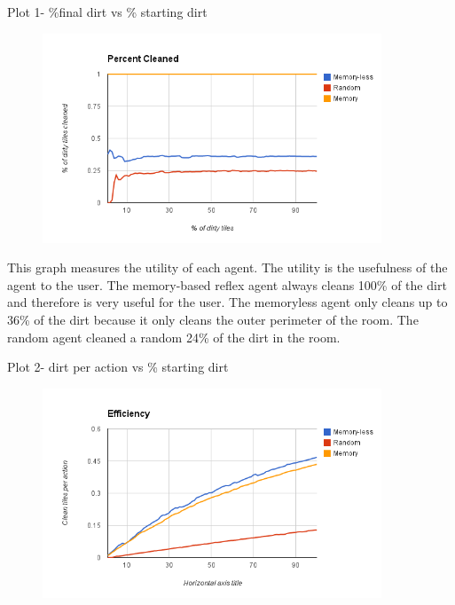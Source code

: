 \documentclass[a4paper,10pt]{article}
\begin{document}
Plot 1- \%final dirt vs \% starting dirt \\
\begin{figure}[H]
	\begin{center}
		\includegraphics[width=0.9\textwidth]{image.png}
	\end{center}
\end{figure}
This graph measures the utility of each agent.
The utility is the usefulness of the agent to the user. 
The memory-based reflex agent always cleans 100\% of the dirt and therefore is very useful for the user.
The memoryless agent only cleans up to 36\% of the dirt because it only cleans the outer perimeter of the room.
The random agent cleaned a random 24\% of the dirt in the room. 

Plot 2- dirt per action vs \% starting dirt
\begin{figure}[H]
	\includegraphics[width=0.9\textwidth]{image1.png}
\end{figure}
\end{document}
